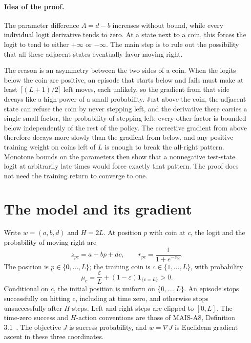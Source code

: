 \documentclass[11pt]{article}
\newcommand{\eps}{\varepsilon}
\newcommand{\grad}{\nabla}
\begin{document}
\paragraph{Idea of the proof.}
The parameter difference $A=d-b$ increases without bound, while every
individual logit derivative tends to zero. At a state next to a coin, this
forces the logit to tend to either $+\infty$ or $-\infty$. The main step is
to rule out the possibility that all these adjacent states eventually favor
moving right.

The reason is an asymmetry between the two sides of a coin. When the
logits below the coin are positive, an episode that starts below and fails
must make at least $\lceil(L+1)/2\rceil$ left moves, each unlikely, so the
gradient from that side decays like a high power of a small probability.
Just above the coin, the adjacent state can refuse the coin by never stepping
left, and the derivative there carries a single small factor, the probability
of stepping left; every other factor is bounded below independently of the
rest of the policy. The corrective gradient from above therefore decays more
slowly than the gradient from below, and any positive training weight on
coins left of $L$ is enough to break the all-right pattern. Monotone bounds
on the parameters then show that a nonnegative test-state logit at
arbitrarily late times would force exactly that pattern. The proof does not
need the training return to converge to one.

\section{The model and its gradient}
Write $w=(a,b,d)$ and $H=2L$. At position $p$ with coin at $c$, the
logit and the probability of moving right are
\[
 z_{pc}=a+bp+dc,\qquad r_{pc}=\frac1{1+e^{-z_{pc}}}.
\]
The position is $p\in\{0,\ldots,L\}$; the training coin is
$c\in\{1,\ldots,L\}$, with probability
\[
 \mu_c=\frac{\eps}{L}+(1-\eps)\mathbf1_{\{c=L\}}>0.
\]
Conditional on $c$, the initial position is uniform on $\{0,\ldots,L\}$.
An episode stops successfully on hitting $c$, including at time zero, and
otherwise stops unsuccessfully after $H$ steps. Left and right steps are
clipped to $[0,L]$. The time-zero success and $H$-action conventions are
those of MAIS-A8, Definition 3.1~\cite{mais-a8}.
The objective $J$ is success probability, and
$\dot w=\grad J$ is Euclidean gradient ascent in these three coordinates.
\end{document}
